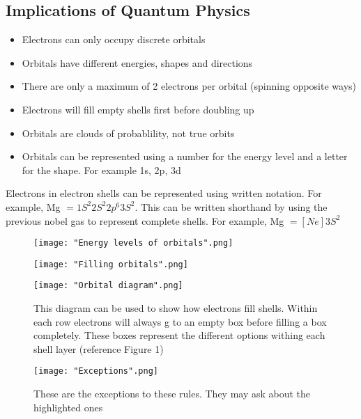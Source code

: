 \documentclass[a4paper, 12pt]{article}
\begin{document}
		\subsection{Implications of Quantum Physics}
			\begin{itemize}
				\item Electrons can only occupy discrete orbitals
				\item Orbitals have different energies, shapes and directions
				\item There are only a maximum of 2 electrons per orbital (spinning opposite ways)
				\item Electrons will fill empty shells first before doubling up
				\item Orbitals are clouds of probablility, not true orbits
				\item Orbitals can be represented using a number for the energy level and a letter for the shape. For example 1s, 2p, 3d 
			\end{itemize}
			
			Electrons in electron shells can be represented using written notation. For example, Mg $= 1S^2 2S^2 2p^6 3S^2$. This can be written shorthand by using the previous nobel gas to represent complete shells. For example, Mg $=[Ne] 3S^2$
			\newpage
			\clearpage
			
			\begin{figure}[!ht]
				\texttt{[image: "Energy levels of orbitals".png]}
				\caption{}
			\end{figure}

			\begin{figure}[!ht]
				\texttt{[image: "Filling orbitals".png]}
				\caption{}
			\end{figure}
			
			\begin{figure}[!ht]
				\texttt{[image: "Orbital diagram".png]}
				\caption{This diagram can be used to show how electrons fill shells. Within each row electrons will always g to an empty box before filling a box completely. These boxes represent the different options withing each shell layer (reference Figure 1)}
			\end{figure} 
			
			\begin{figure}[!ht]
				\texttt{[image: "Exceptions".png]}
				\caption{These are the exceptions to these rules. They may ask about the highlighted ones}
			\end{figure}
			
\end{document}

